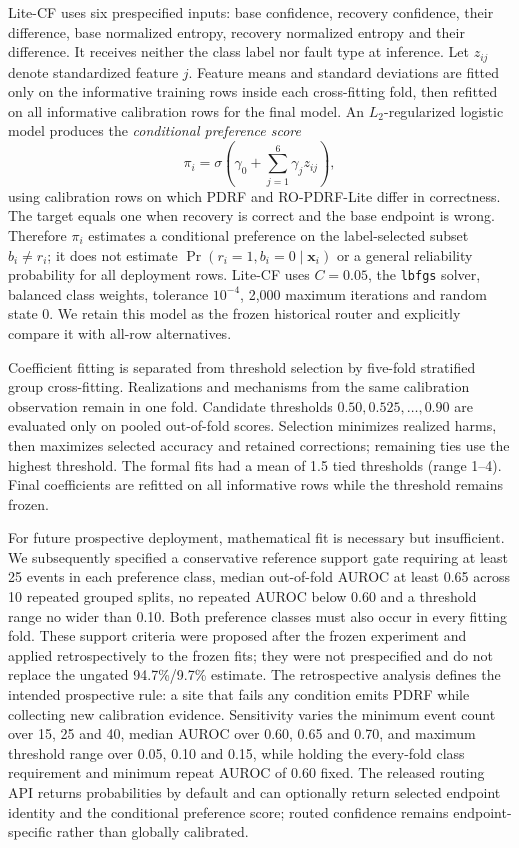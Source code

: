 \documentclass[11pt]{article}
\begin{document}
Lite-CF uses six prespecified inputs: base confidence, recovery confidence, their difference, base normalized entropy, recovery normalized entropy and their difference. It receives neither the class label nor fault type at inference. Let $z_{ij}$ denote standardized feature $j$. Feature means and standard deviations are fitted only on the informative training rows inside each cross-fitting fold, then refitted on all informative calibration rows for the final model. An $L_2$-regularized logistic model produces the \emph{conditional preference score}
\begin{equation}
\pi_i=\sigma\!\left(\gamma_0+\sum_{j=1}^{6}\gamma_j z_{ij}\right),
\end{equation}
using calibration rows on which PDRF and RO-PDRF-Lite differ in correctness. The target equals one when recovery is correct and the base endpoint is wrong. Therefore $\pi_i$ estimates a conditional preference on the label-selected subset $b_i\ne r_i$; it does not estimate $\Pr(r_i=1,b_i=0\mid\mathbf x_i)$ or a general reliability probability for all deployment rows. Lite-CF uses $C=0.05$, the \texttt{lbfgs} solver, balanced class weights, tolerance $10^{-4}$, 2,000 maximum iterations and random state 0. We retain this model as the frozen historical router and explicitly compare it with all-row alternatives.

Coefficient fitting is separated from threshold selection by five-fold stratified group cross-fitting. Realizations and mechanisms from the same calibration observation remain in one fold. Candidate thresholds $0.50,0.525,\ldots,0.90$ are evaluated only on pooled out-of-fold scores. Selection minimizes realized harms, then maximizes selected accuracy and retained corrections; remaining ties use the highest threshold. The formal fits had a mean of 1.5 tied thresholds (range 1--4). Final coefficients are refitted on all informative rows while the threshold remains frozen.

For future prospective deployment, mathematical fit is necessary but insufficient. We subsequently specified a conservative reference support gate requiring at least 25 events in each preference class, median out-of-fold AUROC at least 0.65 across 10 repeated grouped splits, no repeated AUROC below 0.60 and a threshold range no wider than 0.10. Both preference classes must also occur in every fitting fold. These support criteria were proposed after the frozen experiment and applied retrospectively to the frozen fits; they were not prespecified and do not replace the ungated 94.7\%/9.7\% estimate. The retrospective analysis defines the intended prospective rule: a site that fails any condition emits PDRF while collecting new calibration evidence. Sensitivity varies the minimum event count over 15, 25 and 40, median AUROC over 0.60, 0.65 and 0.70, and maximum threshold range over 0.05, 0.10 and 0.15, while holding the every-fold class requirement and minimum repeat AUROC of 0.60 fixed. The released routing API returns probabilities by default and can optionally return selected endpoint identity and the conditional preference score; routed confidence remains endpoint-specific rather than globally calibrated.
\end{document}
